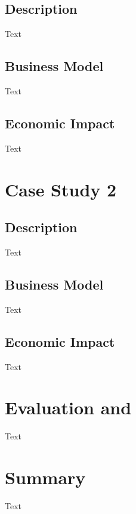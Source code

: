 	\subsection{Description}
	Text
	\subsection{Business Model}
	Text
	\subsection{Economic Impact}
	Text

\section{Case Study 2}
	\subsection{Description}
	Text
	\subsection{Business Model}
	Text
	\subsection{Economic Impact}
	Text

\section{Evaluation and }
Text

\section{Summary}
Text
